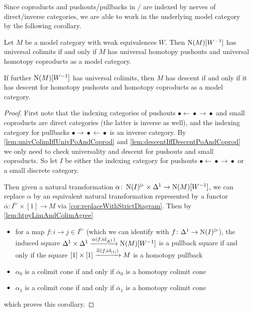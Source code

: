 Since coproducts and pushouts/pullbacks in \inftycats/ are indexed by nerves of direct/inverse categories, we are able to work in the underlying model category by the following corollary.
\begin{corollary}\label{cor:sufficientToProveInModCat}
    Let $M$ be a model category with weak equivalences $W$. 
    Then $\operatorname{N}(M)[W^{-1}]$ has universal colimits if and only if $M$ has universal homotopy pushouts and universal homotopy coproducts as a model category.
    
    If further $\operatorname{N}(M)[W^{-1}]$ has universal colimits, then $M$ has descent if and only if it has descent for homotopy pushouts and homotopy coproducts as a model category.
    \begin{proof}
        First note that the indexing categories of pushouts $\bullet\xleftarrow{}\bullet\xrightarrow{}\bullet$ and small coproducts are direct categories (the latter is inverse as well), and the indexing category for pullbacks $\bullet\xrightarrow{}\bullet\xleftarrow{}\bullet$ is an inverse category.
        By \cref{lem:univColimIffUnivPoAndCoprod} and \cref{lem:descentIffDescentPoAndCoprod} we only need to check universality and descent for pushouts and small coproducts.
        So let $I$ be either the indexing category for pushouts $\bullet\xleftarrow{}\bullet\xrightarrow{}\bullet$ or a small discrete category.

        Then given a natural transformation $\alpha\colon\operatorname{N}(I)^{\rhd}\times\Delta^1\to\operatorname{N}(M)[W^{-1}]$, we can replace $\alpha$ by an equivalent natural transformation represented by a functor $\overline{\alpha}\colon I^{\rhd}\times[1]\to M$ via \cref{cor:replaceWithStrictDiagram}.
        Then by \cref{lem:htpyLimAndColimAgree}
        \begin{itemize}
            \item for a map $f\colon i\to j\in I^{\rhd}$ (which we can identify with $f\colon\Delta^1\to\operatorname{N}(I)^{\rhd}$), the induced square $\Delta^1\times\Delta^1\xrightarrow{\alpha(f,\text{id}_{\Delta^1})}\operatorname{N}(M)[W^{-1}]$ is a pullback square if and only if the square $[1]\times[1]\xrightarrow{\overline{\alpha}(f,\text{id}_{[1]})}M$ is a homotopy pullback
            \item $\alpha_0$ is a colimit cone if and only if $\overline{\alpha}_0$ is a homotopy colimit cone
            \item $\alpha_1$ is a colimit cone if and only if $\overline{\alpha}_1$ is a homotopy colimit cone
        \end{itemize}
        which proves this corollary.
    \end{proof}
\end{corollary}
